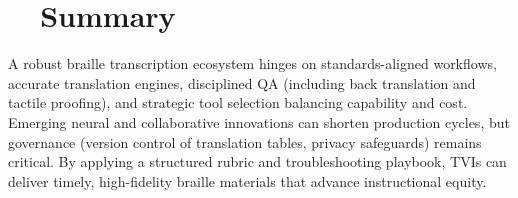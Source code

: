 \section{~~Summary}\label{ch12:sec:summary}
A robust braille transcription ecosystem hinges on standards-aligned workflows, accurate translation engines, disciplined QA (including back translation and tactile proofing), and strategic tool selection balancing capability and cost. Emerging neural and collaborative innovations can shorten production cycles, but governance (version control of translation tables, privacy safeguards) remains critical. By applying a structured rubric and troubleshooting playbook, TVIs can deliver timely, high-fidelity braille materials that advance instructional equity.


